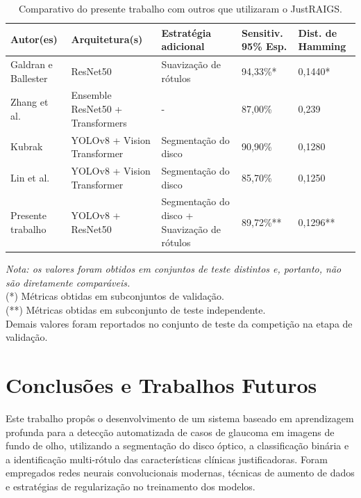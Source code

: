 \documentclass[12pt]{article}
\begin{document}
\begin{table}[h]
    \centering
    \small
    \renewcommand{\arraystretch}{1.5}
    \begin{tabularx}{\textwidth}{p{2cm}XXp{1.9cm}p{1.9cm}}
    \toprule
    \textbf{Autor(es)} & \textbf{Arquitetura(s)} & \textbf{Estratégia adicional} & \textbf{Sensitiv. 95\% Esp.} & \textbf{Dist. de Hamming} \\
    \midrule
    Galdran e Ballester \cite{justraigs_galdran} & ResNet50 & Suavização de rótulos & 94,33\%* & 0,1440* \\

    Zhang et al. \cite{justraigs_zhang} & Ensemble ResNet50 + Transformers & - & 87,00\% & 0,239 \\

    Kubrak \cite{justraigs_kubrak} & YOLOv8 + Vision Transformer & Segmentação do disco & 90,90\% & 0,1280 \\

    Lin et al. \cite{justraigs_hu_lin} & YOLOv8 + Vision Transformer & Segmentação do disco & 85,70\% & 0,1250 \\
    Presente trabalho & YOLOv8 + ResNet50 & Segmentação do disco + Suavização de rótulos & 89,72\%** & 0,1296** \\
    \bottomrule
    \end{tabularx}
    \renewcommand{\arraystretch}{1}
    \newline
    \raggedright
    \scriptsize
    \textit{Nota: os valores foram obtidos em conjuntos de teste distintos e, portanto, não são diretamente comparáveis.} \\
    (*) Métricas obtidas em subconjuntos de validação. \\
    (**) Métricas obtidas em subconjunto de teste independente. \\
    Demais valores foram reportados no conjunto de teste da competição na etapa de validação.
    \caption{Comparativo do presente trabalho com outros que utilizaram o JustRAIGS.}
    \label{tab:final_work_comparative}
\end{table}


\section{Conclusões e Trabalhos Futuros}
\label{sec:conclusions}

Este trabalho propôs o desenvolvimento de um sistema baseado em aprendizagem profunda para a detecção automatizada de casos de glaucoma em imagens de fundo de olho, utilizando a segmentação do disco óptico, a classificação binária e a identificação multi-rótulo das características clínicas justificadoras. Foram empregados redes neurais convolucionais modernas, técnicas de aumento de dados e estratégias de regularização no treinamento dos modelos.
\end{document}
